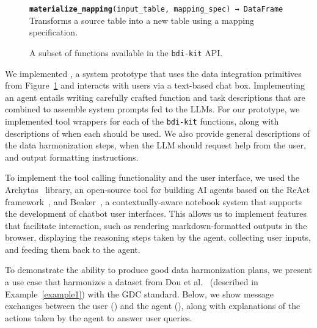 \begin{figure}[t]
\begin{tcolorbox}[colback=black!2.5!white,colframe=black!85!black,boxrule=0.25mm,boxsep=4pt,left=0pt,right=0pt,top=0pt,bottom=0pt]
    
    \texttt{\textbf{materialize\_mapping}(input\_table, mapping\_spec) → DataFrame} \\
    Transforms a source table into a new table using a mapping specification.
    
\end{tcolorbox}
\caption{A subset of functions available in the \texttt{bdi-kit} API.}
\label{fig:bdi-kit}
\end{figure}

 We implemented \systemname, a system prototype that uses the data integration primitives from Figure~\ref{fig:bdi-kit} and interacts with users via a text-based chat box. Implementing an agent entails writing carefully crafted function and task descriptions that are combined to assemble system prompts fed to the LLMs. For our prototype, we implemented tool wrappers for each of the \texttt{bdi-kit} functions, along with descriptions of when each should be used. We also provide general descriptions of the data harmonization steps, when the LLM should request help from the user, and output formatting instructions.

To implement the tool calling functionality and the user interface, we used the Archytas~\cite{archytas} library, an open-source tool for building AI agents based on the ReAct framework~\cite{yao2022react}, and Beaker~\cite{beaker}, a contextually-aware notebook system that supports the development of chatbot user interfaces. This allows us to implement features that facilitate interaction, such as rendering markdown-formatted outputs in the browser, displaying the reasoning steps taken by the agent, collecting user inputs, and feeding them back to the agent.

To demonstrate the ability to produce good data harmonization plans, we present a use case that harmonizes a dataset from Dou et al.~\cite{dou2020proteogenomic} (described in Example~\ref{example1}) with the GDC standard. 
Below, we show message exchanges between the user ({\scriptsize \faUser}) and the agent ({\scriptsize \faRobot}), along with explanations of the actions taken by the agent to answer user queries.


